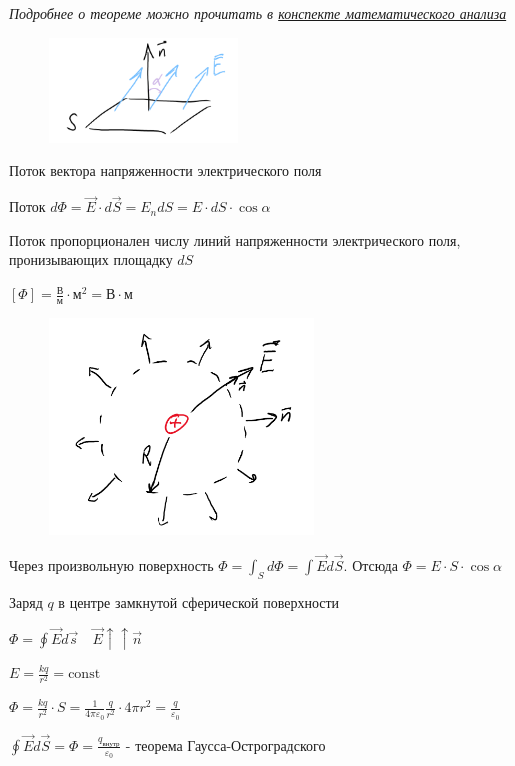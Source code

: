 \documentclass[12pt]{article}
\begin{document}
    \textit{Подробнее о теореме можно прочитать в \href{https://pelmesh619.github.io/itmo_conspects/conspects/calculus/calculus_superconspect.pdf}{конспекте математического анализа}}

    \mediumvspace

    \begin{minipage}{\textwidth}
        \begin{figure}
            \includegraphics[width=5cm]{physics1/images/physics1_2024_11_15_7}
        \end{figure}

        Поток вектора напряженности электрического поля
    
        Поток $d\Phi = \vec{E}\cdot d\vec{S} = E_n dS = E \cdot dS \cdot \cos\alpha$

        Поток пропорционален числу линий напряженности электрического поля, пронизывающих площадку $dS$

        $[\Phi] = \frac{\text{В}}{\text{м}} \cdot \text{м}^2 = \text{В} \cdot \text{м}$

    \end{minipage}

    \begin{minipage}{\textwidth}
        \begin{figure}
            \includegraphics[width=7cm]{physics1/images/physics1_2024_11_15_8}
        \end{figure}
    
        Через произвольную поверхность $\Phi = \int_S d\Phi = \int \vec{E} d\vec{S}$. Отсюда $\Phi = E \cdot S \cdot \cos\alpha$

        Заряд $q$ в центре замкнутой сферической поверхности

        $\Phi = \oint \vec{E} d\vec{s} \quad \vec{E} \uparrow\uparrow \vec{n}$

        $E = \frac{kq}{r^2} = \mathrm{const}$

        $\Phi = \frac{kq}{r^2} \cdot S = \frac{1}{4\pi \varepsilon_0} \frac{q}{r^2} \cdot 4\pi r^2 = \frac{q}{\varepsilon_0}$

        $\oint \vec{E}d\vec{S} = \Phi = \frac{q_{\text{внутр}}}{\varepsilon_0}$ - теорема Гаусса-Остроградского

    \end{minipage}
\end{document}
